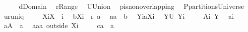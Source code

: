 \begin{isabellebody}
%
\isadelimproof
%
\endisadelimproof
%
\isatagproof
{}\isamarkupfalse%
\ {\isacharminus}\isanewline
\ \ \isamarkupfalse%
\ {\isacharquery}d{\isacharequal}Domain\ \isamarkupfalse%
\ {\isacharquery}r{\isacharequal}Range\ \isamarkupfalse%
\ {\isacharquery}U{\isacharequal}Union\ \isamarkupfalse%
\ {\isacharquery}p{\isacharequal}is{\isacharunderscore}non{\isacharunderscore}overlapping\ \isamarkupfalse%
\ {\isacharquery}P{\isacharequal}partitionsUniverse\ \isamarkupfalse%
\ {\isacharquery}u{\isacharequal}runiq\ \isanewline
\ \ \isamarkupfalse%
\ {\isacharquery}Xi{\isacharequal}{\isachardoublequoteopen}X\ {\isasymunion}\ {\isacharbraceleft}i{\isacharbraceright}{\isachardoublequoteclose}\ \isamarkupfalse%
\ {\isacharquery}b{\isacharequal}{\isachardoublequoteopen}{\isacharquery}Xi\ {\isasymtimes}\ {\isacharparenleft}{\isacharquery}r\ a{\isacharparenright}{\isachardoublequoteclose}\ \isamarkupfalse%
\ {\isacharquery}a{}{\isacharequal}{\isachardoublequoteopen}a\ {\isacharminus}\ {\isacharquery}b{\isachardoublequoteclose}\ \isamarkupfalse%
\ {\isacharquery}Yi{\isacharequal}{\isachardoublequoteopen}a{\isacharbackquote}{\isacharbackquote}{\isacharquery}Xi{\isachardoublequoteclose}\ \isamarkupfalse%
\ {\isacharquery}Y{\isacharequal}{\isachardoublequoteopen}{\isacharquery}U\ {\isacharquery}Yi{\isachardoublequoteclose}\ \isanewline
\ \ \isamarkupfalse%
\ {\isacharquery}A{}{\isacharequal}{\isachardoublequoteopen}{\isacharbraceleft}{\isacharparenleft}i{\isacharcomma}\ {\isacharquery}Y{\isacharparenright}{\isacharbraceright}{\isachardoublequoteclose}\ \isamarkupfalse%
\ {\isacharquery}a{}{\isacharequal}{\isachardoublequoteopen}{\isacharbraceleft}{\isacharparenleft}i{\isacharcomma}{\isacharbraceleft}{\isacharbraceright}{\isacharparenright}{\isacharbraceright}{\isachardoublequoteclose}\ \isamarkupfalse%
\ {\isacharquery}a{}{\isacharequal}{\isachardoublequoteopen}{\isacharquery}A{}\ {\isacharminus}\ {\isacharquery}a{}{\isachardoublequoteclose}\ \isamarkupfalse%
\ {\isacharquery}aa{}{\isacharequal}{\isachardoublequoteopen}a\ outside\ {\isacharquery}Xi{\isachardoublequoteclose}\ \isanewline
\ \ \isamarkupfalse%
\ {\isacharquery}c{\isacharequal}{\isachardoublequoteopen}{\isacharquery}a{}\ {\isasymunion}\ {\isacharquery}a{}{\isachardoublequoteclose}\ \isamarkupfalse%

\end{isabellebody}
